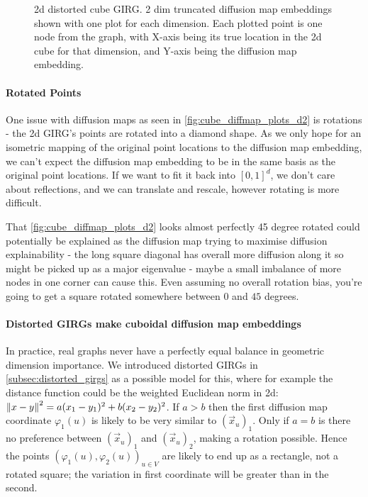 \begin{figure}
  \caption{2d distorted cube GIRG. 2 dim truncated diffusion map embeddings shown with one plot for each dimension. Each plotted point is one node from the graph, with X-axis being its true location in the 2d cube for that dimension, and Y-axis being the diffusion map embedding.}
  \label{fig:2d_distorted_major_minor}
\end{figure}


\paragraph{Rotated Points} One issue with diffusion maps as seen in \cref{fig:cube_diffmap_plots_d2} is rotations - the 2d GIRG's points are rotated into a diamond shape. As we only hope for an isometric mapping of the original point locations to the diffusion map embedding, we can't expect the diffusion map embedding to be in the same basis as the original point locations. If we want to fit it back into $[0, 1]^d$, we don't care about reflections, and we can translate and rescale, however rotating is more difficult.

That \cref{fig:cube_diffmap_plots_d2} looks almost perfectly 45 degree rotated could potentially be explained as the diffusion map trying to maximise diffusion explainability - the long square diagonal has overall more diffusion along it so might be picked up as a major eigenvalue - maybe a small imbalance of more nodes in one corner can cause this. Even assuming no overall rotation bias, you're going to get a square rotated somewhere between $0$ and $45$ degrees.

\paragraph{Distorted GIRGs make cuboidal diffusion map embeddings} In practice, real graphs never have a perfectly equal balance in geometric dimension importance. 
We introduced distorted GIRGs in \cref{subsec:distorted_girgs} as a possible model for this, where for example the distance function could be the weighted Euclidean norm in 2d: $\left\lVert x - y\right\rVert^2 = a (x_1 - y_1)^2 + b(x_2 - y_2)^2$. If $a > b$ then the first diffusion map coordinate $\varphi_1(u)$ is likely to be very similar to $(\vec{x}_u)_1$. Only if $a=b$ is there no preference between $(\vec{x}_u)_1$ and $(\vec{x}_u)_2$, making a rotation possible.
Hence the points $(\varphi_1(u), \varphi_2(u))_{u \in V}$ are likely to end up as a rectangle, not a rotated square; the variation in first coordinate will be greater than in the second.

